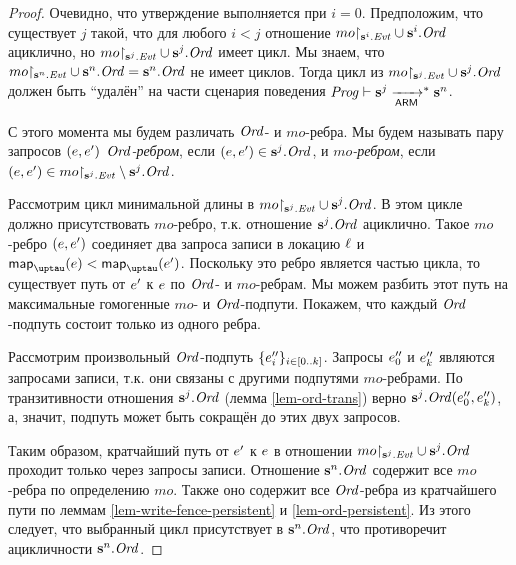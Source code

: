 \begin{proof}
  Очевидно, что утверждение выполняется при $i = 0$.
  Предположим, что существует $j$ такой, что для любого $i < j$ отношение
  $mo{\restriction_{\mathbf{s}^i.\mathit{Evt}}} \cup \mathbf{s}^i.\mathit{Ord}$ ациклично, но
  $mo{\restriction_{\mathbf{s}^j.\mathit{Evt}}} \cup \mathbf{s}^j.\mathit{Ord}$ имеет цикл.
  Мы знаем, что $mo{\restriction_{\mathbf{s}^n.\mathit{Evt}}} \cup \mathbf{s}^n.\mathit{Ord} = \mathbf{s}^n.\mathit{Ord}$ не имеет циклов.
  Тогда цикл из $mo{\restriction_{\mathbf{s}^j.\mathit{Evt}}} \cup \mathbf{s}^j.\mathit{Ord}$ должен быть ``удалён''
  на части сценария поведения $\mathit{Prog} \vdash \mathbf{s}^j \xrightarrow[\mathsf{ARM}]{}^{*} \mathbf{s}^n$.
  
  С этого момента мы будем различать $\mathit{Ord}$- и $mo$-ребра.
  Мы будем называть пару запросов $(e, e')$ \emph{$\mathit{Ord}$-ребром}, если $(e, e') \in \mathbf{s}^j.\mathit{Ord}$,
  и \emph{$mo$-ребром}, если $(e, e') \in mo{\restriction_{\mathbf{s}^j.\mathit{Evt}}} \setminus \mathbf{s}^j.\mathit{Ord}$.

Рассмотрим цикл минимальной длины в ${mo{\restriction_{\mathbf{s}^j.\mathit{Evt}}}} \cup \mathbf{s}^j.\mathit{Ord}$.
В этом цикле должно присутствовать $mo$-ребро, т.к. отношение $\mathbf{s}^j.\mathit{Ord}$ ациклично.
Такое $mo$-ребро $(e, e')$ соединяет два запроса записи в локацию $\ell$ %
и $\taumapping(\e) < \taumapping(\e')$.
Поскольку это ребро является частью цикла, то существует путь от $e'$ к $e$ по
$\mathit{Ord}$- и $mo$-ребрам. Мы можем разбить этот путь на максимальные гомогенные $mo$- и $\mathit{Ord}$-подпути.
Покажем, что каждый $\mathit{Ord}$-подпуть состоит только из одного ребра.

Рассмотрим произвольный $\mathit{Ord}$-подпуть $\{e''_i\}_{i \in [0..k]}$.
Запросы $e''_0$ и $e''_k$ являются запросами записи, т.к. они связаны с другими подпутями
$mo$-ребрами.
По транзитивности отношения $\mathbf{s}^j.\mathit{Ord}$ (лемма \ref{lem-ord-trans})
верно $\mathbf{s}^j.\mathit{Ord}(e''_0, e''_k)$, а, значит, подпуть может быть сокращён до этих
двух запросов.

Таким образом, кратчайший путь от $e'$ к $e$ в отношении
${mo{\restriction_{\mathbf{s}^j.\mathit{Evt}}}} \cup \mathbf{s}^j.\mathit{Ord}$ проходит только через запросы записи.
Отношение $\mathbf{s}^n.\mathit{Ord}$ содержит все $mo$-ребра по определению $mo$. Также оно
содержит все $\mathit{Ord}$-ребра из кратчайшего пути по леммам \ref{lem-write-fence-persistent} и
\ref{lem-ord-persistent}. Из этого следует, что выбранный цикл присутствует в $\mathbf{s}^n.\mathit{Ord}$,
что противоречит ацикличности $\mathbf{s}^n.\mathit{Ord}$.
\end{proof}

